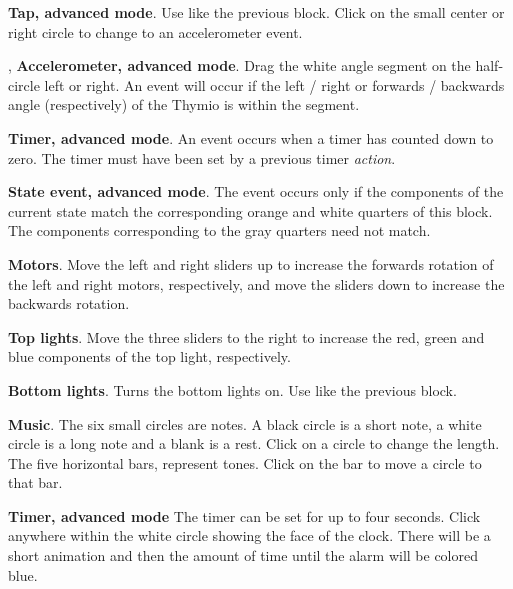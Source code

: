 \bigskip\bigskip\bigskip

 \textbf{Tap, advanced mode}. Use like the
previous block. Click on the small center or right circle to change to
an accelerometer event.

\bigskip\bigskip

,  \textbf{Accelerometer,
advanced mode}. Drag the white angle segment on the half-circle left or right.
An event will occur if the left / right or forwards / backwards angle
(respectively) of the Thymio is within the segment.

\bigskip\bigskip\bigskip\bigskip

 \textbf{Timer, advanced mode}. An event occurs when
a timer has counted down to zero. The timer must have been set by a
previous timer \emph{action}.

\bigskip\bigskip\bigskip

 \textbf{State event, advanced mode}. The event
occurs only if the components of the current state match the
corresponding orange and white quarters of this block. The components
corresponding to the gray quarters need not match.

\bigskip


 \textbf{Motors}. Move the left and right sliders
up to increase the forwards rotation of the left and right motors,
respectively, and move the sliders down to increase the backwards
rotation.

\bigskip\bigskip

 \textbf{Top lights}. Move the three sliders to
the right to increase the red, green and blue components of the top
light, respectively.

\bigskip\bigskip

 \textbf{Bottom lights}. Turns the bottom
lights on. Use like the previous block.

\bigskip\bigskip

 \textbf{Music}. The six small circles are notes. A
black circle is a short note, a white circle is a long note and a blank
is a rest. Click on a circle to change the length. The five horizontal
bars, represent tones. Click on the bar to move a circle to that bar.

\bigskip\bigskip

 \textbf{Timer, advanced mode} The timer can be set
for up to four seconds. Click anywhere within the white circle showing
the face of the clock. There will be a short animation and then the
amount of time until the alarm will be colored blue.


